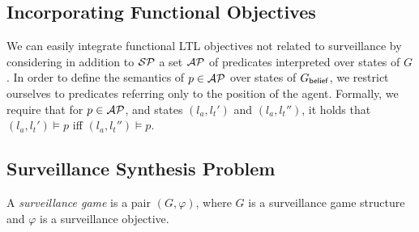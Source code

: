 \subsection{Incorporating Functional Objectives}
We can easily integrate functional LTL objectives not related to surveillance by considering in addition to $\mathcal{SP}$ a set $\mathcal{AP}$ of predicates interpreted over states of $G$. In order to define the semantics of $p \in \mathcal{AP}$ over states of $G_{\mathsf{belief}}$, we restrict ourselves to predicates referring only to the position of the agent. Formally, we require that for $p \in \mathcal{AP}$, and states $(l_a,l_t')$ and $(l_a,l_t'')$, it holds that  $(l_a,l_t') \models p$ iff $(l_a,l_t'') \models p$. 

\begin{example}
\end{example}

\subsection{Surveillance Synthesis Problem}
A \emph{surveillance game} is a pair $(G,\varphi)$, where $G$ is a surveillance game structure and $\varphi$ is a surveillance objective.


